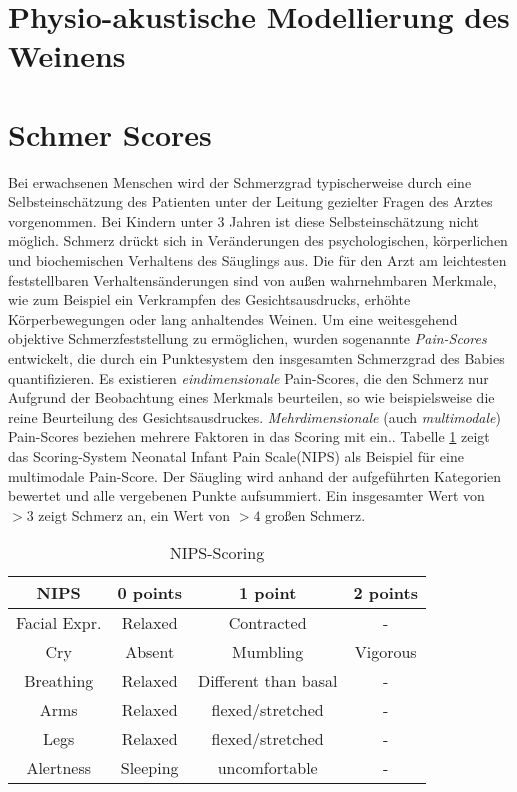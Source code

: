 \section{Physio-akustische Modellierung des Weinens}

\section{Schmer Scores}
Bei erwachsenen Menschen wird der Schmerzgrad typischerweise durch eine Selbsteinschätzung des Patienten unter der Leitung gezielter Fragen des Arztes vorgenommen. Bei Kindern unter 3 Jahren ist diese Selbsteinschätzung nicht möglich. Schmerz drückt sich in Veränderungen des psychologischen, körperlichen und biochemischen Verhaltens des Säuglings aus. Die für den Arzt am leichtesten feststellbaren Verhaltensänderungen sind von außen wahrnehmbaren Merkmale, wie zum Beispiel ein Verkrampfen des Gesichtsausdrucks, erhöhte Körperbewegungen oder lang anhaltendes Weinen. Um eine weitesgehend objektive Schmerzfeststellung zu ermöglichen, wurden sogenannte \emph{Pain-Scores} entwickelt, die durch ein Punktesystem den insgesamten Schmerzgrad des Babies quantifizieren.\cite{PainAssessment01} Es existieren \emph{eindimensionale} Pain-Scores, die den Schmerz nur Aufgrund der Beobachtung eines Merkmals beurteilen, so wie beispielsweise die reine Beurteilung des Gesichtsausdruckes. \emph{Mehrdimensionale} (auch \emph{ multimodale}) Pain-Scores beziehen mehrere Faktoren in das Scoring mit ein.\cite{PainAssessment02}. Tabelle \ref{tab:nips} zeigt das Scoring-System \glqq Neonatal Infant Pain Scale\grqq{}(NIPS) als Beispiel für eine multimodale Pain-Score. Der Säugling wird anhand der aufgeführten Kategorien bewertet und alle vergebenen Punkte aufsummiert. Ein insgesamter Wert von $>3$ zeigt Schmerz an, ein Wert von $>4$ großen Schmerz.\cite{nips}

\begin{table}[h]
	\footnotesize
	\centering
	\caption{NIPS-Scoring}
	\label{tab:nips}
	\begin{tabular}{@{}cccc@{}}
		\toprule
		\textbf{NIPS}     & \textbf{0 points} & \textbf{1 point}     & \textbf{2 points} \\ \midrule
		Facial Expr. & Relaxed           & Contracted           & -                 \\
		Cry               & Absent            & Mumbling             & Vigorous          \\
		Breathing         & Relaxed           & Different than basal & -                 \\
		Arms              & Relaxed           & flexed/stretched     & -                 \\
		Legs              & Relaxed           & flexed/stretched     & -                 \\
		Alertness         & Sleeping          & uncomfortable        & -                 \\ \bottomrule
	\end{tabular}
\end{table}


